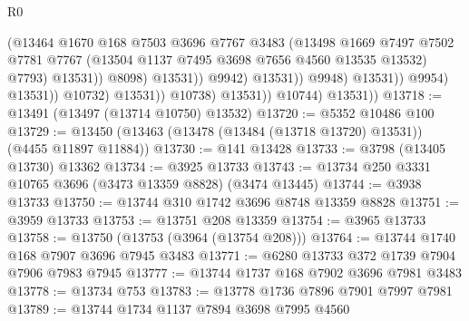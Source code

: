 \begin{lexlean}{R0}
\begin{coremodule}
                                                (@13464
                                                  @1670
                                                  @168
                                                  @7503
                                                  @3696
                                                  @7767
                                                  @3483
                                                  (@13498
                                                    @1669
                                                    @7497
                                                    @7502
                                                    @7781
                                                    @7767
                                                    (@13504
                                                      @1137
                                                      @7495
                                                      @3698
                                                      @7656
                                                      @4560
                                                      @13535
                                                      @13532)
                                                    @7793)
                                                  @13531))
                                              @8098)
                                            @13531))
                                        @9942)
                                      @13531))
                                  @9948)
                                @13531))
                            @9954)
                          @13531))
                      @10732)
                    @13531))
                @10738)
              @13531))
          @10744)
        @13531))
@13718 := @13491 (@13497 (@13714 @10750) @13532)
@13720 := @5352 @10486 @100
@13729 := @13450 (@13463 (@13478 (@13484 (@13718 @13720) @13531)) (@4455 @11897 @11884))
@13730 := @141 @13428
@13733 := @3798 (@13405 @13730) @13362
@13734 := @3925 @13733
@13743 := @13734 @250 @3331 @10765 @3696 (@3473 @13359 @8828) (@3474 @13445)
@13744 := @3938 @13733
@13750 := @13744 @310 @1742 @3696 @8748 @13359 @8828
@13751 := @3959 @13733
@13753 := @13751 @208 @13359
@13754 := @3965 @13733
@13758 := @13750 (@13753 (@3964 (@13754 @208)))
@13764 := @13744 @1740 @168 @7907 @3696 @7945 @3483
@13771 := @6280 @13733 @372 @1739 @7904 @7906 @7983 @7945
@13777 := @13744 @1737 @168 @7902 @3696 @7981 @3483
@13778 := @13734 @753
@13783 := @13778 @1736 @7896 @7901 @7997 @7981
@13789 := @13744 @1734 @1137 @7894 @3698 @7995 @4560

\end{coremodule}
\end{lexlean}
